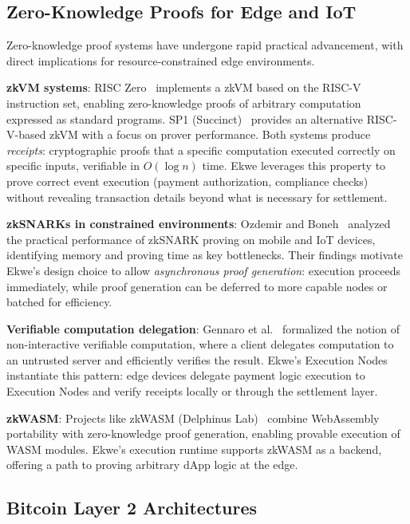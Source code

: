 \documentclass[11pt,a4paper]{article}
\begin{document}
\subsection{Zero-Knowledge Proofs for Edge and IoT}

Zero-knowledge proof systems have undergone rapid practical advancement, with direct implications for resource-constrained edge environments.

\textbf{zkVM systems}: RISC Zero~\cite{risczero} implements a zkVM based on the RISC-V instruction set, enabling zero-knowledge proofs of arbitrary computation expressed as standard programs. SP1 (Succinct)~\cite{sp1} provides an alternative RISC-V-based zkVM with a focus on prover performance. Both systems produce \textit{receipts}: cryptographic proofs that a specific computation executed correctly on specific inputs, verifiable in $O(\log n)$ time. Ekwe leverages this property to prove correct event execution (payment authorization, compliance checks) without revealing transaction details beyond what is necessary for settlement.

\textbf{zkSNARKs in constrained environments}: Ozdemir and Boneh~\cite{ozdemir_experimenting} analyzed the practical performance of zkSNARK proving on mobile and IoT devices, identifying memory and proving time as key bottlenecks. Their findings motivate Ekwe's design choice to allow \textit{asynchronous proof generation}: execution proceeds immediately, while proof generation can be deferred to more capable nodes or batched for efficiency.

\textbf{Verifiable computation delegation}: Gennaro et al.~\cite{gennaro_verifiable} formalized the notion of non-interactive verifiable computation, where a client delegates computation to an untrusted server and efficiently verifies the result. Ekwe's Execution Nodes instantiate this pattern: edge devices delegate payment logic execution to Execution Nodes and verify receipts locally or through the settlement layer.

\textbf{zkWASM}: Projects like zkWASM (Delphinus Lab)~\cite{zkwasm} combine WebAssembly portability with zero-knowledge proof generation, enabling provable execution of WASM modules. Ekwe's execution runtime supports zkWASM as a backend, offering a path to proving arbitrary dApp logic at the edge.

\subsection{Bitcoin Layer 2 Architectures}
\end{document}
